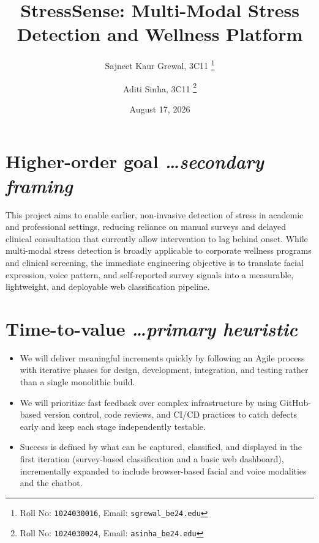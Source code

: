 \documentclass[11pt,a4paper]{article}
\title{StressSense: Multi-Modal Stress Detection and Wellness Platform}
\author{
  Sajneet Kaur Grewal, 3C11%
  \thanks{Roll No: \texttt{1024030016}, %
    Email: \texttt{sgrewal\_be24\@thapar.edu}}
  \and 
  Aditi Sinha, 3C11%
  \thanks{Roll No: \texttt{1024030024}, %
    Email: \texttt{asinha\_be24\@thapar.edu}}
}
\date{August 17, 2026}
\newcommand{\BvrHint}[1]{%
  {\normalfont\normalsize\itshape\hfill #1}}
\begin{document}
\maketitle

\section{Higher-order goal%
  \BvrHint{\ldots secondary framing}}
This project aims to enable earlier, non-invasive detection of stress in academic and professional settings, reducing reliance on manual surveys and delayed clinical consultation that currently allow intervention to lag behind onset. While multi-modal stress detection is broadly applicable to corporate wellness programs and clinical screening, the immediate engineering objective is to translate facial expression, voice pattern, and self-reported survey signals into a measurable, lightweight, and deployable web classification pipeline.

\section{Time-to-value %
\BvrHint{\ldots primary heuristic}}
\begin{itemize}[leftmargin=0.7cm]
    \item We will deliver meaningful increments quickly by following an Agile process with iterative phases for design, development, integration, and testing rather than a single monolithic build.
    \item We will prioritize fast feedback over complex infrastructure by using GitHub-based version control, code reviews, and CI/CD practices to catch defects early and keep each stage independently testable.
    \item Success is defined by what can be captured, classified, and displayed in the first iteration (survey-based classification and a basic web dashboard), incrementally expanded to include browser-based facial and voice modalities and the chatbot.
\end{itemize}
\end{document}
